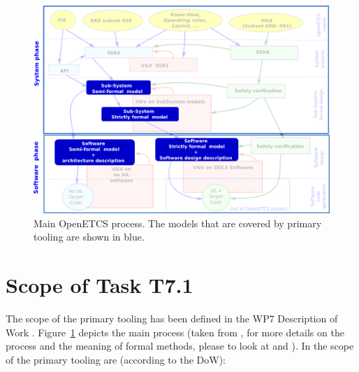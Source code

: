  \begin{figure}[b!]
  \centering
  \includegraphics[scale=0.45]{images/WholeProcess.png}
  \caption{Main OpenETCS process.  The models that are covered by primary tooling are shown in blue.}
  \label{fig:main_process}
\end{figure}


\section{Scope of Task T7.1}

The scope of the primary tooling has been defined in the WP7 Description of Work \citep{WP7_D01}.  Figure~\ref{fig:main_process} depicts the main process (taken from \citep{D2_3}, for more details on the process and the meaning of formal methods, please to look at \citep{D2_3} and \citep{D2_4}).  In the scope of the primary tooling are (according to the DoW):

